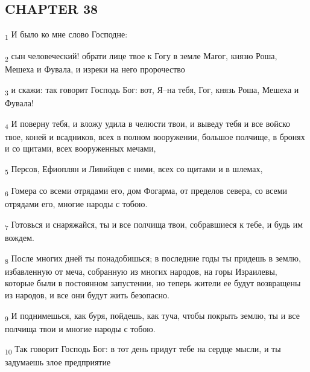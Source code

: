 \subsection{CHAPTER 38}
\begin{tcolorbox}
\textsubscript{1} И было ко мне слово Господне:
\end{tcolorbox}
\begin{tcolorbox}
\textsubscript{2} сын человеческий! обрати лице твое к Гогу в земле Магог, князю Роша, Мешеха и Фувала, и изреки на него пророчество
\end{tcolorbox}
\begin{tcolorbox}
\textsubscript{3} и скажи: так говорит Господь Бог: вот, Я--на тебя, Гог, князь Роша, Мешеха и Фувала!
\end{tcolorbox}
\begin{tcolorbox}
\textsubscript{4} И поверну тебя, и вложу удила в челюсти твои, и выведу тебя и все войско твое, коней и всадников, всех в полном вооружении, большое полчище, в бронях и со щитами, всех вооруженных мечами,
\end{tcolorbox}
\begin{tcolorbox}
\textsubscript{5} Персов, Ефиоплян и Ливийцев с ними, всех со щитами и в шлемах,
\end{tcolorbox}
\begin{tcolorbox}
\textsubscript{6} Гомера со всеми отрядами его, дом Фогарма, от пределов севера, со всеми отрядами его, многие народы с тобою.
\end{tcolorbox}
\begin{tcolorbox}
\textsubscript{7} Готовься и снаряжайся, ты и все полчища твои, собравшиеся к тебе, и будь им вождем.
\end{tcolorbox}
\begin{tcolorbox}
\textsubscript{8} После многих дней ты понадобишься; в последние годы ты придешь в землю, избавленную от меча, собранную из многих народов, на горы Израилевы, которые были в постоянном запустении, но теперь жители ее будут возвращены из народов, и все они будут жить безопасно.
\end{tcolorbox}
\begin{tcolorbox}
\textsubscript{9} И поднимешься, как буря, пойдешь, как туча, чтобы покрыть землю, ты и все полчища твои и многие народы с тобою.
\end{tcolorbox}
\begin{tcolorbox}
\textsubscript{10} Так говорит Господь Бог: в тот день придут тебе на сердце мысли, и ты задумаешь злое предприятие
\end{tcolorbox}
